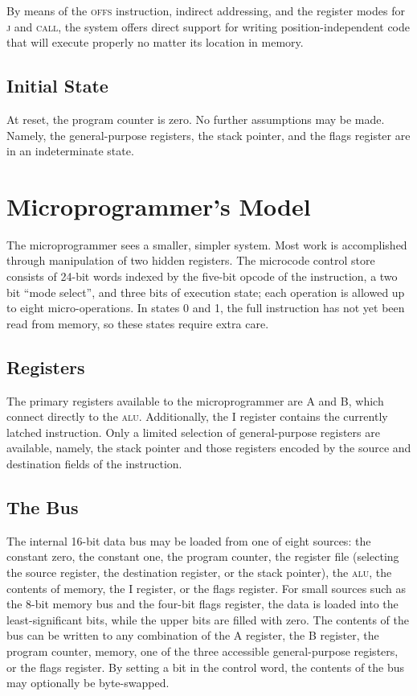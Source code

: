 \documentclass[11pt]{book}
\begin{document}
By means of the \textsc{offs} instruction,
indirect addressing, and
the register modes for \textsc{j} and \textsc{call},
the system offers direct support
for writing position-independent code
that will execute properly no matter its location in memory.

\subsection{Initial State}
At reset, the program counter is zero.
No further assumptions may be made.
Namely, the general-purpose registers,
the stack pointer,
and the flags register are in an indeterminate state.

\section{Microprogrammer's Model}
The micro\-programmer sees a smaller, simpler system.
Most work is accomplished through manipulation of two hidden registers.
The microcode control store consists of
24-bit words indexed by the five-bit opcode of the instruction,
a two bit ``mode select'',
and three bits of execution state;
each operation is allowed up to eight micro-operations.
In states 0 and 1, the full instruction has not yet been read
from memory, so these states require extra care.

\subsection{Registers}
The primary registers available to the micro\-programmer are
A and B, which connect directly to the \textsc{alu}.
Additionally, the I register contains the currently latched instruction.
Only a limited selection of general-purpose registers are available,
namely, the stack pointer
and those registers encoded by the source and destination fields
of the instruction.

\subsection{The Bus}
The internal 16-bit data bus may be loaded from one of eight sources:
the constant zero,
the constant one,
the program counter,
the register file
(selecting the source register,
 the destination register,
 or the stack pointer),
the \textsc{alu},
the contents of memory,
the I register, or
the flags register.
For small sources such as the 8-bit memory bus
and the four-bit flags register,
the data is loaded into the least-significant bits,
while the upper bits are filled with zero.
The contents of the bus can be written to any combination of
the A register,
the B register,
the program counter,
memory,
one of the three accessible general-purpose registers,
or the flags register.
By setting a bit in the control word,
the contents of the bus may optionally be byte-swapped.
\end{document}
